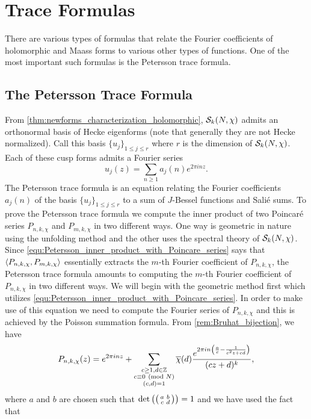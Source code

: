 \chapter{Trace Formulas}
  There are various types of formulas that relate the Fourier coefficients of holomorphic and Maass forms to various other types of functions. One of the most important such formulas is the Petersson trace formula.
  \section{The Petersson Trace Formula}
    From \cref{thm:newforms_characterization_holomorphic}, $\mathcal{S}_{k}(N,\chi)$ admits an orthonormal basis of Hecke eigenforms (note that generally they are not Hecke normalized). Call this basis $\{u_{j}\}_{1 \le j \le r}$ where $r$ is the dimension of $\mathcal{S}_{k}(N,\chi)$. Each of these cusp forms admits a Fourier series
    \[
      u_{j}(z) = \sum_{n \ge 1}a_{j}(n)e^{2\pi inz}.
    \]
    The Petersson trace formula is an equation relating the Fourier coefficients $a_{j}(n)$ of the basis $\{u_{j}\}_{1 \le j \le r}$ to a sum of $J$-Bessel functions and Sali\'e sums. To prove the Petersson trace formula we compute the inner product of two Poincar\'e series $P_{n,k,\chi}$ and $P_{m,k,\chi}$ in two different ways. One way is geometric in nature using the unfolding method and the other uses the spectral theory of $\mathcal{S}_{k}(N,\chi)$. Since \cref{equ:Petersson_inner_product_with_Poincare_series} says that $\langle P_{n,k,\chi},P_{m,k,\chi}\rangle$ essentially extracts the $m$-th Fourier coefficient of $P_{n,k,\chi}$, the Petersson trace formula amounts to computing the $m$-th Fourier coefficient of $P_{n,k,\chi}$ in two different ways. We will begin with the geometric method first which utilizes \cref{equ:Petersson_inner_product_with_Poincare_series}. In order to make use of this equation we need to compute the Fourier series of $P_{n,k,\chi}$ and this is achieved by the Poisson summation formula. From \cref{rem:Bruhat_bijection}, we have
    \[
      P_{n,k,\chi}(z) = e^{2\pi inz}+\sum_{\substack{c \ge 1, d \in \mathbb{Z} \\ c \equiv 0 \ \left(\text{mod }N\right) \\ (c,d) = 1}}\overline{\chi}(d)\frac{e^{2\pi in\left(\frac{a}{c}-\frac{1}{c^{2}z+cd}\right)}}{(cz+d)^{k}},
    \]
    where $a$ and $b$ are chosen such that $\det\left(\begin{psmallmatrix} a & b \\ c & d \end{psmallmatrix}\right) = 1$ and we have used the fact that
